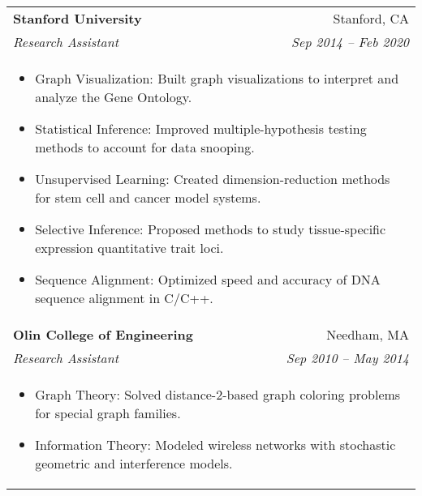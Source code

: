 \documentclass[letterpaper,11pt]{article}
\begin{document}
\begin{tabular*}{0.97\textwidth}[t]{l@{\extracolsep{\fill}}r}
  \textbf{Stanford University} & Stanford, CA \\
  \textit{\small Research Assistant} & \textit{\small Sep 2014 -- Feb 2020} \\
  \multicolumn{2}{l}{
    \begin{minipage}{\textwidth}
      \vspace{0.3em}
      \begin{itemize}[leftmargin=*, itemsep=-4.5pt, topsep=0pt, label={\raisebox{0.4ex}{\tiny\textbullet}}]
        \item  Graph Visualization: Built graph visualizations to interpret and analyze the Gene Ontology.
        \item  Statistical Inference: Improved multiple-hypothesis testing methods to account for data snooping.
        \item  Unsupervised Learning: Created dimension-reduction methods for stem cell and cancer model systems.
        \item  Selective Inference: Proposed methods to study tissue-specific expression quantitative trait loci.
        \item  Sequence Alignment: Optimized speed and accuracy of DNA sequence alignment in C/C++.
      \end{itemize}
    \end{minipage}
  } \\
  \noalign{\vspace{0.7em}}

  \textbf{Olin College of Engineering} & Needham, MA \\
  \textit{\small Research Assistant} & \textit{\small Sep 2010 -- May 2014} \\
  \multicolumn{2}{l}{
    \begin{minipage}{\textwidth}
      \vspace{0.3em}
      \begin{itemize}[leftmargin=*, itemsep=-4.5pt, topsep=0pt, label={\raisebox{0.4ex}{\tiny\textbullet}}]
        \item  Graph Theory: Solved distance-2-based graph coloring problems for special graph families.
        \item  Information Theory: Modeled wireless networks with stochastic geometric and interference models.
      \end{itemize}
    \end{minipage}
  } \\
\end{tabular*}
\end{document}
